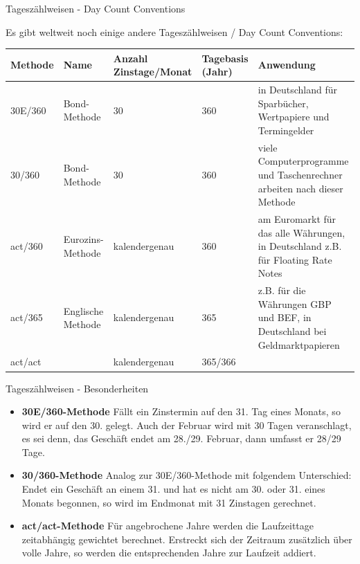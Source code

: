 \begin{frame}{Tageszählweisen - Day Count Conventions}
	\scriptsize{\begin{bemerkung}
		Es gibt weltweit noch einige andere Tageszählweisen / Day Count Conventions:
		\begin{tabular}{|p{1.3cm}p{1.1cm}p{1.3cm}p{0.9cm}p{3.4cm}|}
			\hline \rule[-2ex]{0pt}{5.5ex} Methode & Name & Anzahl Zinstage/Monat & Tagebasis (Jahr) & Anwendung \\ 
			\hline \hline \rule[-2ex]{0pt}{5.5ex} 30E/360 & Bond-Methode & 30 & 360 & in Deutschland für Sparbücher, Wertpapiere und Termingelder \\ 
			\hline \rule[-2ex]{0pt}{5.5ex} 30/360 & Bond-Methode & 30 & 360 & viele Computerprogramme und Taschenrechner arbeiten nach dieser Methode \\ 
			\hline \rule[-2ex]{0pt}{5.5ex} act/360 & Eurozins-Methode & kalendergenau & 360 & am Euromarkt für das alle Währungen, in Deutschland z.B. für Floating Rate Notes \\ 
			\hline \rule[-2ex]{0pt}{5.5ex} act/365 & Englische Methode & kalendergenau & 365 & z.B. für die Währungen GBP und BEF, in Deutschland bei Geldmarktpapieren \\ 
			\hline \rule[-2ex]{0pt}{5.5ex} act/act &  & kalendergenau & 365/366 &  \\ 
			\hline 
		\end{tabular} 
	\end{bemerkung}}
\end{frame}

\begin{frame}{Tageszählweisen - Besonderheiten}
	\begin{bemerkung}
		\begin{itemize}
			\item \textbf{30E/360-Methode} Fällt ein Zinstermin auf den 31. Tag eines Monats, so wird er auf den 30. gelegt. Auch der Februar wird mit 30 Tagen veranschlagt, es sei denn, das Geschäft endet am 28./29. Februar, dann umfasst er 28/29 Tage.
			\item \textbf{30/360-Methode} Analog zur 30E/360-Methode mit folgendem Unterschied: Endet ein Geschäft an einem 31. und hat es nicht am 30. oder 31. eines Monats begonnen, so wird im Endmonat mit 31 Zinstagen gerechnet.
			\item \textbf{act/act-Methode} Für angebrochene Jahre werden die Laufzeittage zeitabhängig gewichtet berechnet. Erstreckt sich der Zeitraum zusätzlich über volle Jahre, so werden die entsprechenden Jahre zur Laufzeit addiert. 
		\end{itemize}
	\end{bemerkung}
\end{frame}

